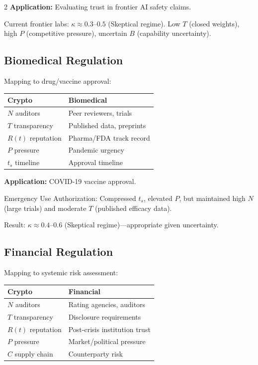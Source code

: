 \documentclass[11pt]{article}
\begin{document}
\begin{multicols}{2}
\textbf{Application:} Evaluating trust in frontier AI safety claims.

Current frontier labs: $\kappa \approx 0.3$--$0.5$ (Skeptical regime). Low $T$ (closed weights), high $P$ (competitive pressure), uncertain $B$ (capability uncertainty).

\subsection{Biomedical Regulation}

Mapping to drug/vaccine approval:

\begin{center}
\small
\begin{tabular}{@{}ll@{}}
\toprule
\textbf{Crypto} & \textbf{Biomedical} \\
\midrule
$N$ auditors & Peer reviewers, trials \\
$T$ transparency & Published data, preprints \\
$R(t)$ reputation & Pharma/FDA track record \\
$P$ pressure & Pandemic urgency \\
$t_s$ timeline & Approval timeline \\
\bottomrule
\end{tabular}
\end{center}

\textbf{Application:} COVID-19 vaccine approval.

Emergency Use Authorization: Compressed $t_s$, elevated $P$, but maintained high $N$ (large trials) and moderate $T$ (published efficacy data).

Result: $\kappa \approx 0.4$--$0.6$ (Skeptical regime)---appropriate given uncertainty.

\subsection{Financial Regulation}

Mapping to systemic risk assessment:

\begin{center}
\small
\begin{tabular}{@{}ll@{}}
\toprule
\textbf{Crypto} & \textbf{Financial} \\
\midrule
$N$ auditors & Rating agencies, auditors \\
$T$ transparency & Disclosure requirements \\
$R(t)$ reputation & Post-crisis institution trust \\
$P$ pressure & Market/political pressure \\
$C$ supply chain & Counterparty risk \\
\bottomrule
\end{tabular}
\end{center}


\end{multicols}
\end{document}
